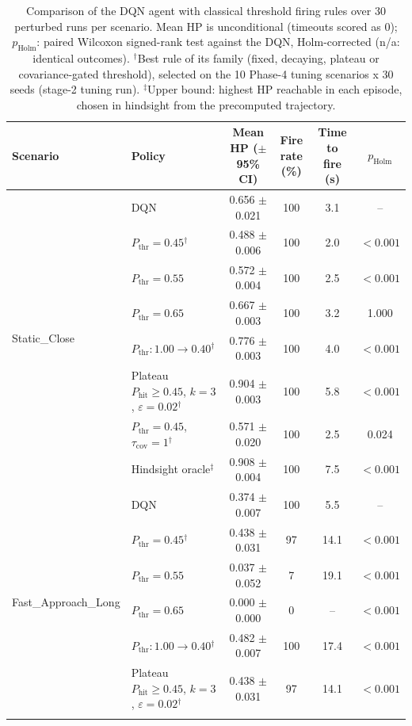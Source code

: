 \begin{table}[htbp]
\centering
\caption{Comparison of the DQN agent with classical threshold firing rules over 30 perturbed runs per scenario. Mean HP is unconditional (timeouts scored as 0); $p_{\mathrm{Holm}}$: paired Wilcoxon signed-rank test against the DQN, Holm-corrected (n/a: identical outcomes). $^{\dagger}$Best rule of its family (fixed, decaying, plateau or covariance-gated threshold), selected on the 10 Phase-4 tuning scenarios x 30 seeds (stage-2 tuning run). $^{\ddagger}$Upper bound: highest HP reachable in each episode, chosen in hindsight from the precomputed trajectory.}
\label{tab:comparison-traditional-rl}
\small
\begin{tabular}{llcccc}
\toprule
\textbf{Scenario} & \textbf{Policy} & \textbf{Mean HP ($\pm$95\% CI)} & \textbf{Fire rate (\%)} & \textbf{Time to fire (s)} & $p_{\mathrm{Holm}}$ \\
\midrule
\multirow{8}{*}{Static\_Close} & DQN & 0.656 $\pm$ 0.021 & 100 & 3.1 & -- \\
 & $P_{\mathrm{thr}}=0.45$$^{\dagger}$ & 0.488 $\pm$ 0.006 & 100 & 2.0 & $<0.001$ \\
 & $P_{\mathrm{thr}}=0.55$ & 0.572 $\pm$ 0.004 & 100 & 2.5 & $<0.001$ \\
 & $P_{\mathrm{thr}}=0.65$ & 0.667 $\pm$ 0.003 & 100 & 3.2 & 1.000 \\
 & $P_{\mathrm{thr}}: 1.00 \to 0.40$$^{\dagger}$ & 0.776 $\pm$ 0.003 & 100 & 4.0 & $<0.001$ \\
 & Plateau $P_{\mathrm{hit}}\geq0.45$, $k=3$, $\varepsilon=0.02$$^{\dagger}$ & 0.904 $\pm$ 0.003 & 100 & 5.8 & $<0.001$ \\
 & $P_{\mathrm{thr}}=0.45$, $\tau_{\mathrm{cov}}=1$$^{\dagger}$ & 0.571 $\pm$ 0.020 & 100 & 2.5 & 0.024 \\
 & Hindsight oracle$^{\ddagger}$ & 0.908 $\pm$ 0.004 & 100 & 7.5 & $<0.001$ \\
\midrule
\multirow{8}{*}{Fast\_Approach\_Long} & DQN & 0.374 $\pm$ 0.007 & 100 & 5.5 & -- \\
 & $P_{\mathrm{thr}}=0.45$$^{\dagger}$ & 0.438 $\pm$ 0.031 & 97 & 14.1 & $<0.001$ \\
 & $P_{\mathrm{thr}}=0.55$ & 0.037 $\pm$ 0.052 & 7 & 19.1 & $<0.001$ \\
 & $P_{\mathrm{thr}}=0.65$ & 0.000 $\pm$ 0.000 & 0 & -- & $<0.001$ \\
 & $P_{\mathrm{thr}}: 1.00 \to 0.40$$^{\dagger}$ & 0.482 $\pm$ 0.007 & 100 & 17.4 & $<0.001$ \\
 & Plateau $P_{\mathrm{hit}}\geq0.45$, $k=3$, $\varepsilon=0.02$$^{\dagger}$ & 0.438 $\pm$ 0.031 & 97 & 14.1 & $<0.001$ \\
$$
\end{tabular}
\end{table}
